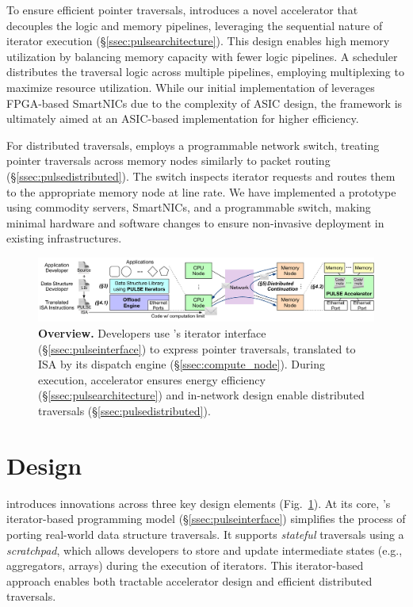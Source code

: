 To ensure efficient pointer traversals, \pulse introduces a novel accelerator that decouples the logic and memory pipelines, leveraging the sequential nature of iterator execution (\S\ref{ssec:pulsearchitecture}). This design enables high memory utilization by balancing memory capacity with fewer logic pipelines. A scheduler distributes the traversal logic across multiple pipelines, employing multiplexing to maximize resource utilization. While our initial implementation of \pulse leverages FPGA-based SmartNICs due to the complexity of ASIC design, the framework is ultimately aimed at an ASIC-based implementation for higher efficiency.

For distributed traversals, \pulse employs a programmable network switch, treating pointer traversals across memory nodes similarly to packet routing (\S\ref{ssec:pulsedistributed}). The switch inspects iterator requests and routes them to the appropriate memory node at line rate. We have implemented a prototype using commodity servers, SmartNICs, and a programmable switch, making minimal hardware and software changes to ensure non-invasive deployment in existing infrastructures.






\begin{figure}[ht!]
  \centering
  \includegraphics[width=\textwidth]{fig/pulse/overview.pdf}
  \caption[\pulse Overview]{\textbf{\pulse Overview.} Developers use \pulse's iterator interface (\S\ref{ssec:pulseinterface}) to express pointer traversals, translated to \pulse ISA by its dispatch engine (\S\ref{ssec:compute_node}). During execution, \pulse accelerator ensures energy efficiency (\S\ref{ssec:pulsearchitecture}) and in-network design enable distributed traversals (\S\ref{ssec:pulsedistributed}).} 
  \label{fig:general}
\end{figure}


\section{\pulse Design}
\label{sec:pulsedesign}
\pulse introduces innovations across three key design elements (Fig.~\ref{fig:general}). At its core, \pulse's iterator-based programming model (\S\ref{ssec:pulseinterface}) simplifies the process of porting real-world data structure traversals. It supports \emph{stateful} traversals using a \emph{scratchpad}, which allows developers to store and update intermediate states (e.g., aggregators, arrays) during the execution of iterators. This iterator-based approach enables both tractable accelerator design and efficient distributed traversals.

